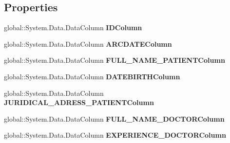 \subsection*{Properties}
\begin{CompactItemize}
\item 
global::System.Data.DataColumn \textbf{IDColumn}\hspace{0.3cm}{\tt  [get]}\label{class_automatic_medical_system_1_1_data_set1_1_1_v_a_r_c_f_a_m_i_l_y_d_o_c_t_o_r_r_e_c_o_r_d_s_data_table_24b1ac36ef43ac7ff3a20d33e2833e47}

\item 
global::System.Data.DataColumn \textbf{ARCDATEColumn}\hspace{0.3cm}{\tt  [get]}\label{class_automatic_medical_system_1_1_data_set1_1_1_v_a_r_c_f_a_m_i_l_y_d_o_c_t_o_r_r_e_c_o_r_d_s_data_table_a4b4de51d71f9cd1ae601013a51d3202}

\item 
global::System.Data.DataColumn \textbf{FULL\_\-NAME\_\-PATIENTColumn}\hspace{0.3cm}{\tt  [get]}\label{class_automatic_medical_system_1_1_data_set1_1_1_v_a_r_c_f_a_m_i_l_y_d_o_c_t_o_r_r_e_c_o_r_d_s_data_table_ce35bceff34f10b7c17522bc25de1323}

\item 
global::System.Data.DataColumn \textbf{DATEBIRTHColumn}\hspace{0.3cm}{\tt  [get]}\label{class_automatic_medical_system_1_1_data_set1_1_1_v_a_r_c_f_a_m_i_l_y_d_o_c_t_o_r_r_e_c_o_r_d_s_data_table_a51857ce28afd48a22306dab28a5446e}

\item 
global::System.Data.DataColumn \textbf{JURIDICAL\_\-ADRESS\_\-PATIENTColumn}\hspace{0.3cm}{\tt  [get]}\label{class_automatic_medical_system_1_1_data_set1_1_1_v_a_r_c_f_a_m_i_l_y_d_o_c_t_o_r_r_e_c_o_r_d_s_data_table_f745bdc3fa1103259fd66529d25e360d}

\item 
global::System.Data.DataColumn \textbf{FULL\_\-NAME\_\-DOCTORColumn}\hspace{0.3cm}{\tt  [get]}\label{class_automatic_medical_system_1_1_data_set1_1_1_v_a_r_c_f_a_m_i_l_y_d_o_c_t_o_r_r_e_c_o_r_d_s_data_table_bcc7b5603faedc1daa8167323b852f95}

\item 
global::System.Data.DataColumn \textbf{EXPERIENCE\_\-DOCTORColumn}\hspace{0.3cm}{\tt  [get]}\label{class_automatic_medical_system_1_1_data_set1_1_1_v_a_r_c_f_a_m_i_l_y_d_o_c_t_o_r_r_e_c_o_r_d_s_data_table_9d639c232e3c289d0e6c92a968d3baa9}


\end{CompactItemize}
